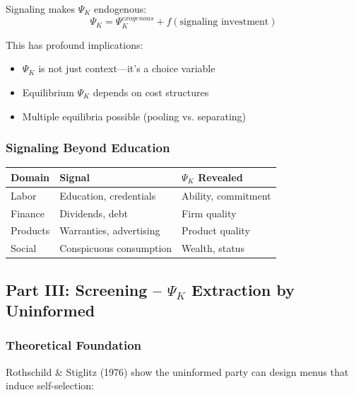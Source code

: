 Signaling makes $\Psi_K$ endogenous:
\begin{equation}
\Psi_K = \Psi_K^{exogenous} + f(\text{signaling investment})
\end{equation}

This has profound implications:
\begin{itemize}
    \item $\Psi_K$ is not just context—it's a choice variable
    \item Equilibrium $\Psi_K$ depends on cost structures
    \item Multiple equilibria possible (pooling vs. separating)
\end{itemize}

\subsubsection{Signaling Beyond Education}

\begin{center}
\renewcommand{\arraystretch}{1.3}
\begin{tabular}{|l|l|l|}
\hline
\textbf{Domain} & \textbf{Signal} & \textbf{$\Psi_K$ Revealed} \\
\hline
Labor & Education, credentials & Ability, commitment \\
Finance & Dividends, debt & Firm quality \\
Products & Warranties, advertising & Product quality \\
Social & Conspicuous consumption & Wealth, status \\
\hline
\end{tabular}
\end{center}

\subsection{Part III: Screening – $\Psi_K$ Extraction by Uninformed}

\subsubsection{Theoretical Foundation}

Rothschild \& Stiglitz (1976) show the uninformed party can design menus 
that induce self-selection:


